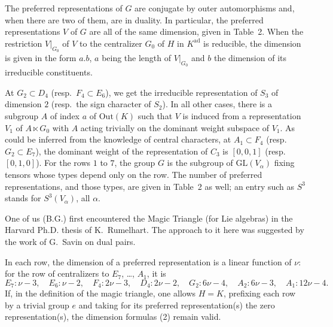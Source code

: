 \documentclass[11pt,a4paper]{article}
\begin{document}
\medskip
\noindent
The preferred representations of $G$ are conjugate by outer automorphisms and, when there are two of them, are in duality. In particular, the preferred representations $V$ of $G$ are all of the same dimension, given in Table~2. When the restriction $V|_{G_{0}}$ of $V$ to the centralizer $G_{0}$ of $H$ in $K^{\mathrm{ad}}$ is reducible, the dimension is given in the form $a.b$, $a$ being the length of $V|_{G_{0}}$ and $b$ the dimension of its irreducible constituents.

At $G_{2} \subset D_{4}$ (resp.~$F_{4} \subset E_{6}$), we get the irreducible representation of $S_{3}$ of dimension $2$ (resp.~the sign character of $S_{2}$). In all other cases, there is a subgroup $A$ of index $a$ of $\mathrm{Out}(K)$ such that $V$ is induced from a representation $V_{1}$ of $A \ltimes G_{0}$ with $A$ acting trivially on the dominant weight subspace of $V_{1}$. As could be inferred from the knowledge of central characters, at $A_{1} \subset F_{4}$ (resp.~$G_{2} \subset E_{7}$), the dominant weight of the representation of $C_{3}$ is $[0,0,1]$ (resp.~$[0,1,0]$). For the rows $1$ to $7$, the group $G$ is the subgroup of $\mathrm{GL}(V_{\alpha})$ fixing tensors whose types depend only on the row. The number of preferred representations, and those types, are given in Table~2 as well; an entry such as $S^{3}$ stands for $S^{3}(V_{\alpha})$, all $\alpha$.

One of us (B.G.) first encountered the Magic Triangle (for Lie algebras) in the Harvard Ph.D. thesis of K.~Rumelhart. The approach to it here was suggested by the work of G.~Savin on dual pairs.

In each row, the dimension of a preferred representation is a linear function of $\nu$: for the row of centralizers to $E_{7}$, \ldots, $A_{1}$, it is
\begin{equation}
E_{7}: \nu - 3, \quad E_{6}: \nu - 2, \quad F_{4}: 2\nu - 3, \quad D_{4}: 2\nu - 2, \quad G_{2}: 6\nu - 4, \quad A_{2}: 6\nu - 3, \quad A_{1}: 12\nu - 4.
\end{equation}
If, in the definition of the magic triangle, one allows $H = K$, prefixing each row by a trivial group $e$ and taking for its preferred representation(s) the zero representation(s), the dimension formulas (2) remain valid.
\end{document}
